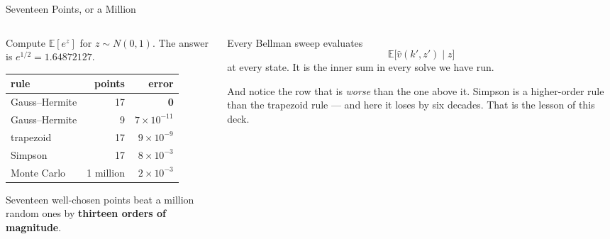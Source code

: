 \begin{frame}{Seventeen Points, or a Million}
\begin{columns}[T]
\begin{column}{0.50\textwidth}
\small
Compute $\mathbb{E}[e^{z}]$ for $z\sim N(0,1)$. The answer is $e^{1/2}=1.64872127$.
\medskip
\begin{center}\footnotesize
\begin{tabularx}{\linewidth}{@{}>{\raggedright\arraybackslash}X r r@{}}
\toprule
\textbf{rule} & \textbf{points} & \textbf{error} \\
\midrule
Gauss--Hermite & 17 & \textbf{0} \\
Gauss--Hermite & 9 & $7\times10^{-11}$ \\
trapezoid & 17 & $9\times10^{-9}$ \\
Simpson & 17 & $8\times10^{-3}$ \\
Monte Carlo & 1 million & $2\times10^{-3}$ \\
\bottomrule
\end{tabularx}
\end{center}
\medskip
Seventeen well-chosen points beat a million random ones by \textbf{thirteen orders of magnitude}.
\end{column}
\begin{column}{0.47\textwidth}
\begin{conceptbox}[title=\textbf{Why you should care}]\small
Every Bellman sweep evaluates
\[
  \mathbb{E}\big[\hat v(k',z')\mid z\big]
\]
at every state. It is the inner sum in every solve we have run.
\end{conceptbox}
\medskip
\begin{takeawaybox}\footnotesize
And notice the row that is \emph{worse} than the one above it. Simpson is a higher-order rule than the trapezoid rule --- and here it loses by six decades. That is the lesson of this deck.
\end{takeawaybox}
\end{column}
\end{columns}
\end{frame}

